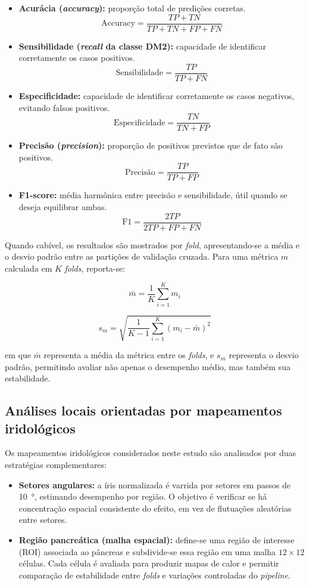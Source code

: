 \documentclass[12pt,a4paper]{article}
\begin{document}
\begin{itemize}
    \item \textbf{Acurácia (\textit{accuracy}):} proporção total de predições corretas.
    \[
    \mathrm{Accuracy} = \frac{TP + TN}{TP + TN + FP + FN}
    \]

    \item \textbf{Sensibilidade (\textit{recall} da classe DM2):} capacidade de identificar corretamente os casos positivos.
    \[
    \mathrm{Sensibilidade} = \frac{TP}{TP + FN}
    \]

    \item \textbf{Especificidade:} capacidade de identificar corretamente os casos negativos, evitando falsos positivos.
    \[
    \mathrm{Especificidade} = \frac{TN}{TN + FP}
    \]

    \item \textbf{Precisão (\textit{precision}):} proporção de positivos previstos que de fato são positivos.
    \[
    \text{Precisão} = \frac{TP}{TP + FP}
    \]

    \item \textbf{F1-score:} média harmônica entre precisão e sensibilidade, útil quando se deseja equilibrar ambas.
    \[
    \mathrm{F1} = \frac{2TP}{2TP + FP + FN}
    \]
\end{itemize}

Quando cabível, os resultados são mostrados por \textit{fold}, apresentando-se a média e o desvio padrão entre as partições de validação cruzada. Para uma métrica \(m\) calculada em \(K\) \textit{folds}, reporta-se:

\[
\bar{m} = \frac{1}{K}\sum_{i=1}^{K} m_i
\]

\[
s_m = \sqrt{\frac{1}{K-1}\sum_{i=1}^{K}(m_i - \bar{m})^2}
\]

em que \(\bar{m}\) representa a média da métrica entre os \textit{folds}, e \(s_m\) representa o desvio padrão, permitindo avaliar não apenas o desempenho médio, mas também sua estabilidade.
\subsection{Análises locais orientadas por mapeamentos iridológicos}
\label{sec:locais}
Os mapeamentos iridológicos considerados neste estudo são analisados por duas estratégias complementares:

\begin{itemize}
    \item \textbf{Setores angulares:} a íris normalizada é varrida por setores em passos de \SI{10}{\degree}, estimando desempenho por região. O objetivo é verificar se há concentração espacial consistente do efeito, em vez de flutuações aleatórias entre setores.

    \item \textbf{Região pancreática (malha espacial):} define-se uma região de interesse (ROI) associada ao pâncreas e subdivide-se essa região em uma malha \(\num{12}\times\num{12}\) células. Cada célula é avaliada para produzir mapas de calor e permitir comparação de estabilidade entre \textit{folds} e variações controladas do \textit{pipeline}.
\end{itemize}
\end{document}
